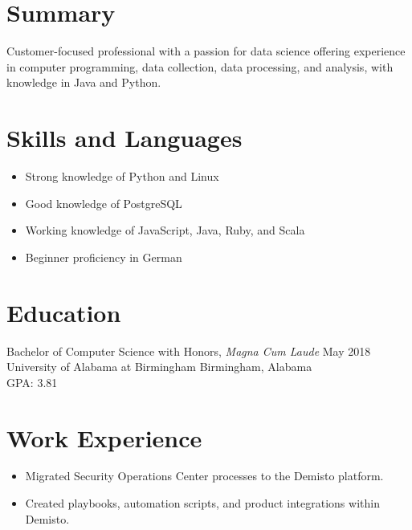 \documentclass[10pt]{setzerresume}
\begin{document}


  \section{Summary}
  Customer-focused professional with a passion for data science offering experience in computer programming, data collection, data processing, and analysis, with knowledge in Java and Python.

  \section{Skills and Languages}

  \begin{itemize}[nosep]
    \item Strong knowledge of Python and Linux
    \item Good knowledge of PostgreSQL
    \item Working knowledge of JavaScript, Java, Ruby, and Scala
    \item Beginner proficiency in German
  \end{itemize}

  \section{Education}
  Bachelor of Computer Science with Honors, \textit{Magna Cum Laude} \hfill May 2018 \\
  University of Alabama at Birmingham \hfill Birmingham, Alabama \\
  GPA\@: 3.81


  \section{Work Experience}


  \begin{itemize}[nosep]
    \item Migrated Security Operations Center processes to the Demisto platform.
    \item Created playbooks, automation scripts, and product integrations within Demisto.
  \end{itemize}
\end{document}
